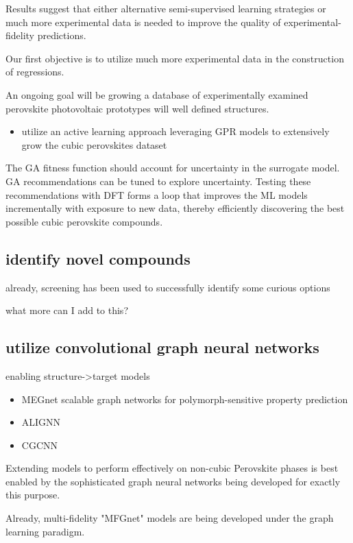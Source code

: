 \documentclass[aip, jmp, amsmath, amssymb]{revtex4-2}
\begin{document}
Results suggest that either alternative semi-supervised learning
strategies or much more experimental data is needed to improve the
quality of experimental-fidelity predictions.

Our first objective is to utilize much more experimental data in the
construction of regressions.

An ongoing goal will be growing a database of experimentally examined
perovskite photovoltaic prototypes will well defined structures.

\begin{itemize}
\item utilize an active learning approach leveraging GPR models to
extensively grow the cubic perovskites dataset
\end{itemize}

The GA fitness function should account for uncertainty in the
surrogate model. GA recommendations can be tuned to explore
uncertainty. Testing these recommendations with DFT forms a loop that
improves the ML models incrementally with exposure to new data,
thereby efficiently discovering the best possible cubic perovskite
compounds.

\subsection*{identify novel compounds}
\label{sec:orgef8deee}
already, screening has been used to successfully identify some curious options

what more can I add to this?

\subsection*{utilize convolutional graph neural networks}
\label{sec:orga6d8948}
enabling structure->target models
\begin{itemize}
\item MEGnet scalable graph networks for polymorph-sensitive property
prediction\cite{chen-2019-graph-networ}
\item ALIGNN\cite{choudhary-2021-atomis-line}
\item CGCNN
\end{itemize}

Extending models to perform effectively on non-cubic Perovskite phases
is best enabled by the sophisticated graph neural networks being
developed for exactly this purpose.

Already, multi-fidelity "MFGnet" models are being developed under the graph
learning paradigm\cite{chen-2020-multi-fidel}.
\end{document}
